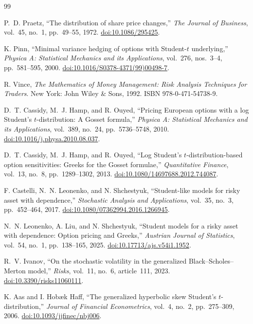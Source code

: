 \documentclass[11pt,a4paper]{article}
\newcommand{\doi}[1]{\href{https://doi.org/#1}{doi:#1}}
\begin{document}
\begin{thebibliography}{99}
\small
\raggedright

P.~D. Praetz,
``The distribution of share price changes,''
\emph{The Journal of Business}, vol.~45, no.~1, pp.~49--55, 1972.
\doi{10.1086/295425}.

K. Pinn,
``Minimal variance hedging of options with Student-$t$ underlying,''
\emph{Physica A: Statistical Mechanics and its Applications},
vol.~276, nos.~3--4, pp.~581--595, 2000.
\doi{10.1016/S0378-4371(99)00498-7}.

R. Vince,
\emph{The Mathematics of Money Management: Risk Analysis Techniques for
Traders}. New York: John Wiley \& Sons, 1992. ISBN 978-0-471-54738-9.

D.~T. Cassidy, M.~J. Hamp, and R. Ouyed,
``Pricing European options with a log Student's $t$-distribution: A Gosset
formula,''
\emph{Physica A: Statistical Mechanics and its Applications},
vol.~389, no.~24, pp.~5736--5748, 2010.
\doi{10.1016/j.physa.2010.08.037}.

D.~T. Cassidy, M.~J. Hamp, and R. Ouyed,
``Log Student's $t$-distribution-based option sensitivities: Greeks for the
Gosset formulae,''
\emph{Quantitative Finance}, vol.~13, no.~8, pp.~1289--1302, 2013.
\doi{10.1080/14697688.2012.744087}.

F. Castelli, N.~N. Leonenko, and N. Shchestyuk,
``Student-like models for risky asset with dependence,''
\emph{Stochastic Analysis and Applications},
vol.~35, no.~3, pp.~452--464, 2017.
\doi{10.1080/07362994.2016.1266945}.

N.~N. Leonenko, A. Liu, and N. Shchestyuk,
``Student models for a risky asset with dependence: Option pricing and
Greeks,''
\emph{Austrian Journal of Statistics},
vol.~54, no.~1, pp.~138--165, 2025.
\doi{10.17713/ajs.v54i1.1952}.

R.~V. Ivanov,
``On the stochastic volatility in the generalized Black--Scholes--Merton
model,''
\emph{Risks}, vol.~11, no.~6, article~111, 2023.
\doi{10.3390/risks11060111}.

K. Aas and I. Hob\ae k Haff,
\textquotedblleft The generalized hyperbolic skew Student's
$t$-distribution,\textquotedblright
\emph{Journal of Financial Econometrics},
vol.~4, no.~2, pp.~275--309, 2006.
\doi{10.1093/jjfinec/nbj006}.


\end{thebibliography}
\end{document}
